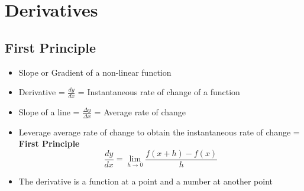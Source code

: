 \documentclass[12pt letter]{report}
\begin{document}


\chapter{Derivatives}
\section{First Principle}
\begin{itemize}
	\item Slope or Gradient of a non-linear function
	\item Derivative = $\frac{dy}{dx}$ = Instantaneous rate of change of a function
	\item Slope of a line = $\frac{\Delta y}{\Delta x}$ = Average rate of change
	\item Leverage average rate of change to obtain the instantaneous rate of change = \textbf{First Principle}
	      \begin{equation*}
		      \frac{dy}{dx} = \lim_{h \to 0} \frac{f(x+h)- f(x)}{h}
	      \end{equation*}
	\item The derivative is a function at a point and a number at another point
\end{itemize}
\end{document}
